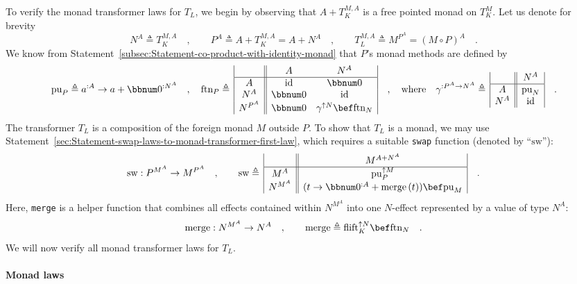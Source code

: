 To verify the monad transformer laws for $T_{L}$, we begin by observing
that $A+T_{K}^{M,A}$ is a free pointed monad on $T_{K}^{M}$. Let
us denote for brevity 
\[
N^{A}\triangleq T_{K}^{M,A}\quad,\quad\quad P^{A}\triangleq A+T_{K}^{M,A}=A+N^{A}\quad,\quad\quad T_{L}^{M,A}\triangleq M^{P^{A}}=\left(M\circ P\right)^{A}\quad.
\]
We know from Statement~\ref{subsec:Statement-co-product-with-identity-monad}
that $P$\textsf{'}s monad methods are defined by
\[
\text{pu}_{P}\triangleq a^{:A}\rightarrow a+\bbnum 0^{:N^{A}}\quad,\quad\text{ftn}_{P}\triangleq\,\begin{array}{|c||cc|}
 & A & N^{A}\\
\hline A & \text{id} & \bbnum 0\\
N^{A} & \bbnum 0 & \text{id}\\
N^{P^{A}} & \bbnum 0 & \gamma^{\uparrow N}\bef\text{ftn}_{N}
\end{array}\quad,\quad\text{where}\quad\gamma^{:P^{A}\rightarrow N^{A}}\triangleq\,\begin{array}{|c||c|}
 & N^{A}\\
\hline A & \text{pu}_{N}\\
N^{A} & \text{id}
\end{array}\quad.
\]
The transformer $T_{L}$ is a composition of the foreign monad $M$
outside $P$. To show that $T_{L}$ is a monad, we may use Statement~\ref{sec:Statement-swap-laws-to-monad-transformer-first-law},
which requires a suitable \lstinline!swap! function (denoted by \textsf{``}$\text{sw}$\textsf{''}):
\begin{equation}
\text{sw}:P^{M^{A}}\rightarrow M^{P^{A}}\quad,\quad\quad\text{sw}\triangleq\,\begin{array}{|c||c|}
 & M^{A+N^{A}}\\
\hline M^{A} & \text{pu}_{P}^{\uparrow M}\\
N^{M^{A}} & (t\rightarrow\bbnum 0^{:A}+\text{merge}\,(t))\bef\text{pu}_{M}
\end{array}\quad.\label{eq:def-of-swap-for-free-pointed-monad-transformer}
\end{equation}
Here, \lstinline!merge! is a helper function that combines all effects
contained within $N^{M^{A}}$ into one $N$-effect represented by
a value of type $N^{A}$:
\[
\text{merge}:N^{M^{A}}\rightarrow N^{A}\quad,\quad\quad\text{merge}\triangleq\text{flift}_{K}^{\uparrow N}\bef\text{ftn}_{N}\quad.
\]
We will now verify all monad transformer laws for $T_{L}.$

\paragraph{Monad laws}

